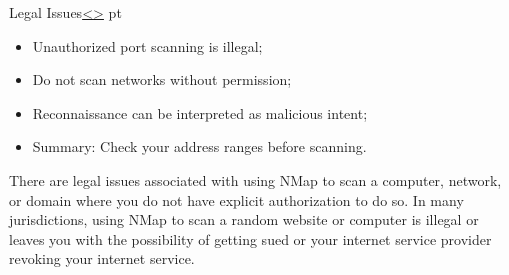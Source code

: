 \documentclass[12pt]{article}
\newenvironment{instructionblock}{\Large\bgroup}{\egroup}
\begin{document}
\pagebreak
\begin{slide}{Legal Issues}{\hyperref[slide 2]{\textless}\hyperref[slide 4]{\textgreater}}
    pt
   \begin{instructionblock}
      \begin{itemize}
         \item Unauthorized port scanning is illegal;
         \item Do not scan networks without permission;
         \item Reconnaissance can be interpreted as malicious intent;
            \item Summary: Check your address ranges before scanning.
      \end{itemize}
   \end{instructionblock}
\end{slide}

There are legal issues associated with using NMap to scan a computer, network, or domain where you do not have explicit authorization to do so. In many jurisdictions, using NMap to scan a random website or computer is illegal or leaves you with the possibility of getting sued or your internet service provider revoking your internet service.
\cite{ NMap} 

\pagebreak


\end{document}
